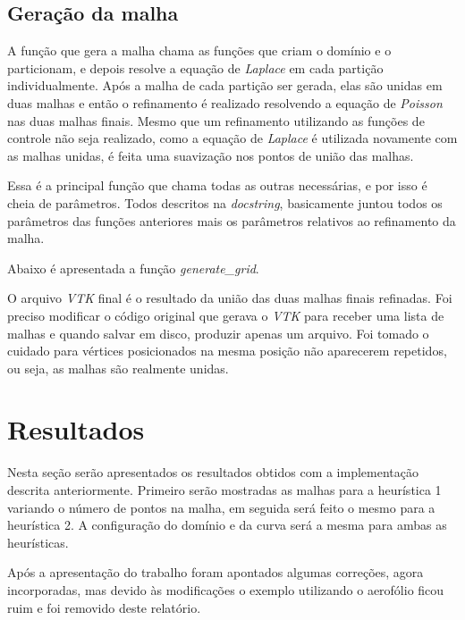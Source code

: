 \documentclass[a4paper]{article}
\begin{document}


\subsection{Geração da malha}

A função que gera a malha chama as funções que criam o domínio e o particionam, e depois resolve a equação de \textit{Laplace} em cada partição individualmente. Após a malha de cada partição ser gerada, elas são unidas em duas malhas e então o refinamento é realizado resolvendo a equação de \textit{Poisson} nas duas malhas finais. Mesmo que um refinamento utilizando as funções de controle não seja realizado, como a equação de \textit{Laplace} é utilizada novamente com as malhas unidas, é feita uma suavização nos pontos de união das malhas.

Essa é a principal função que chama todas as outras necessárias, e por isso é cheia de parâmetros. Todos descritos na \textit{docstring}, basicamente juntou todos os parâmetros das funções anteriores mais os parâmetros relativos ao refinamento da malha.

Abaixo é apresentada a função \textit{generate\_grid}.


O arquivo \textit{VTK} final é o resultado da união das duas malhas finais refinadas. Foi preciso modificar o código original que gerava o \textit{VTK} para receber uma lista de malhas e quando salvar em disco, produzir apenas um arquivo. Foi tomado o cuidado para vértices posicionados na mesma posição não aparecerem repetidos, ou seja, as malhas são realmente unidas.


\section{Resultados}


Nesta seção serão apresentados os resultados obtidos com a implementação descrita anteriormente. Primeiro serão mostradas as malhas para a heurística 1 variando o número de pontos na malha, em seguida será feito o mesmo para a heurística 2.
A configuração do domínio e da curva será a mesma para ambas as heurísticas.

Após a apresentação do trabalho foram apontados algumas correções, agora incorporadas, mas devido às modificações o exemplo utilizando o aerofólio ficou ruim e foi removido deste relatório.
\end{document}
